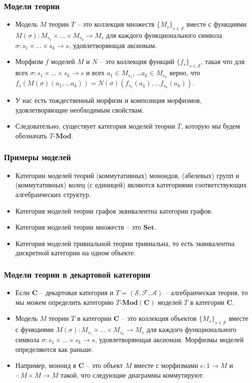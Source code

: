\documentclass{beamer}
\theoremstyle{definition}
\newcommand{\cat}[1]{\mathbf{#1}}
\renewcommand{\C}{\cat{C}}
\newcommand{\Set}{\cat{Set}}
\newcommand{\Mod}[1]{#1\text{-}\cat{Mod}}
\begin{document}
\begin{frame}
\frametitle{Модели теории}
\begin{itemize}
\item Модель $M$ теории $T$ -- это коллекция множеств $\{ M_s \}_{s \in \mathcal{S}}$ вместе с функциями $M(\sigma) : M_{s_1} \times \ldots \times M_{s_k} \to M_s$
для каждого функционального символа $\sigma : s_1 \times \ldots \times s_k \to s$, удовлетворяющая аксиомам.
\item Морфизм $f$ моделей $M$ и $N$ -- это коллекция функций $\{ f_s \}_{s \in \mathcal{S}}$, такая что для всех $\sigma : s_1 \times \ldots \times s_k \to s$ и всех $a_1 \in M_{s_1}$, \ldots $a_k \in M_{s_k}$ верно,
что $f_s(M(\sigma)(a_1, \ldots a_k)) = N(\sigma)(f_{s_1}(a_1), \ldots f_{s_k}(a_k))$.
\item У нас есть тождественный морфизм и композиция морфизмов, удовлетворяющие необходимым свойствам.
\item Следовательно, существует категория моделей теории $T$, которую мы будем обозначать $\Mod{T}$.
\end{itemize}
\end{frame}

\begin{frame}
\frametitle{Примеры моделей}
\begin{itemize}
\item Категории моделей теорий (коммутативных) моноидов, (абелевых) групп и (коммутативных) колец (с единицей) являются категориями соответствующих алгебраических структур.
\item Категория моделей теории графов эквивалентна категории графов.
\item Категория моделей теории множеств -- это $\Set$.
\item Категория моделей тривиальной теории тривиальна, то есть эквивалентна дискретной категории на одном объекте.
\end{itemize}
\end{frame}

\begin{frame}
\frametitle{Модели теории в декартовой категории}
\begin{itemize}
\item Если $\C$ -- декартовая категория и $T = (\mathcal{S},\mathcal{F},\mathcal{A})$ -- алгебраическая теория, то мы можем определить категорию $\Mod{T}(\C)$ моделей $T$ в категории $\C$.
\item Модель $M$ теории $T$ в категории $\C$ -- это коллекция объектов $\{ M_s \}_{s \in \mathcal{S}}$ вместе с функциями $M(\sigma) : M_{s_1} \times \ldots \times M_{s_k} \to M_s$
для каждого функционального символа $\sigma : s_1 \times \ldots \times s_k \to s$, удовлетворяющая аксиомам.
Морфизмы моделей определяются как раньше.
\item Например, моноид в $\C$ -- это объект $M$ вместе с морфизмами $e : 1 \to M$ и $\cdot : M \times M \to M$ такой, что следующие диаграммы коммутируют.
\end{itemize}
\end{frame}
\end{document}

